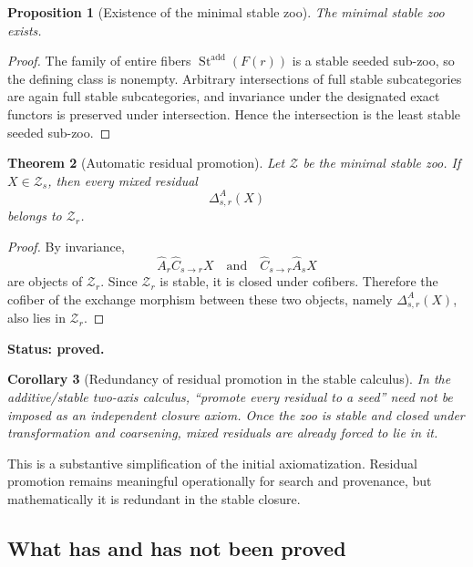 \documentclass[11pt]{article}
\newtheorem{theorem}{Theorem}[section]
\newtheorem{proposition}[theorem]{Proposition}
\newtheorem{corollary}[theorem]{Corollary}
\theoremstyle{definition}
\theoremstyle{remark}
\newcommand{\status}[1]{\textbf{Status: #1.}}
\begin{document}
\begin{proposition}[Existence of the minimal stable zoo]\label{prop:min-stable-zoo}
The minimal stable zoo exists.
\end{proposition}

\begin{proof}
The family of entire fibers $\operatorname{St}^{\mathrm{add}}(F(r))$ is a stable seeded sub-zoo, so the defining class is nonempty. Arbitrary intersections of full stable subcategories are again full stable subcategories, and invariance under the designated exact functors is preserved under intersection. Hence the intersection is the least stable seeded sub-zoo.
\end{proof}

\begin{theorem}[Automatic residual promotion]\label{thm:auto-promotion}
Let $\mathcal Z$ be the minimal stable zoo. If $X\in\mathcal Z_s$, then every mixed residual
\[
\Delta^A_{s,r}(X)
\]
belongs to $\mathcal Z_r$.
\end{theorem}

\begin{proof}
By invariance,
\[
\widehat A_r\widehat C_{s\to r}X
\quad\text{and}\quad
\widehat C_{s\to r}\widehat A_sX
\]
are objects of $\mathcal Z_r$. Since $\mathcal Z_r$ is stable, it is closed under cofibers. Therefore the cofiber of the exchange morphism between these two objects, namely $\Delta^A_{s,r}(X)$, also lies in $\mathcal Z_r$.
\end{proof}

\status{proved}

\begin{corollary}[Redundancy of residual promotion in the stable calculus]\label{cor:promotion-redundant}
In the additive/stable two-axis calculus, ``promote every residual to a seed'' need not be imposed as an independent closure axiom. Once the zoo is stable and closed under transformation and coarsening, mixed residuals are already forced to lie in it.
\end{corollary}

This is a substantive simplification of the initial axiomatization. Residual promotion remains meaningful operationally for search and provenance, but mathematically it is redundant in the stable closure.

\subsection{What has and has not been proved}
\end{document}
